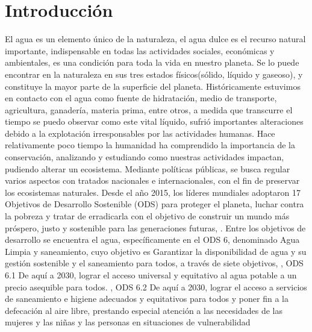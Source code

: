 

\chapter[Introducción]{Introducción}
\pagestyle{fancy}


El agua es un elemento \'unico de la naturaleza, \cite{caribbean_seguridad_2020} el agua dulce es el recurso natural importante, indispensable en todas las actividades sociales, económicas y ambientales, es una condición para toda la vida en nuestro planeta.
Se lo puede encontrar en la naturaleza en sus tres estados f\'isicos(sólido, l\'iquido y gaseoso), y constituye la  mayor parte de la superficie del planeta.
Hist\'oricamente estuvimos en contacto con el agua como fuente de hidratación, medio de transporte, agricultura, ganadería, materia prima, entre otros, a medida que transcurre el tiempo se puedo observar como este vital líquido, sufrió importantes alteraciones debido a la explotación irresponsables por las actividades humanas. 
Hace relativamente poco tiempo la humanidad ha comprendido la importancia de la conservación, analizando y estudiando como nuestras actividades impactan, pudiendo alterar un ecosistema.
Mediante pol\'iticas p\'ublicas, se busca regular varios aspectos con tratados nacionales e internacionales, con el fin de preservar los ecosistemas naturales.
Desde el a\~no 2015, los líderes mundiales adoptaron 17 Objetivos de Desarrollo Sostenible (ODS) para proteger el planeta, luchar contra la pobreza y tratar de erradicarla con el objetivo de construir un mundo más próspero,  justo y sostenible para las generaciones futuras, \cite{bbva_que_nodate}. 
Entre los objetivos de desarrollo se encuentra el agua, espec\'ificamente en el ODS 6, denominado Agua Limpia y saneamiento, cuyo objetivo es Garantizar la disponibilidad de agua y su gestión sostenible y el saneamiento para todos, a trav\'es de siete objetivos, \cite{onu_agua_nodate} 
, ODS 6.1  De aquí a 2030, lograr el acceso universal y equitativo al agua potable a un precio asequible para todos.
, ODS 6.2  De aquí a 2030, lograr el acceso a servicios de saneamiento e higiene adecuados y equitativos para todos y poner fin a la defecación al aire libre, prestando especial atención a las necesidades de las mujeres y las niñas y las personas en situaciones de vulnerabilidad
